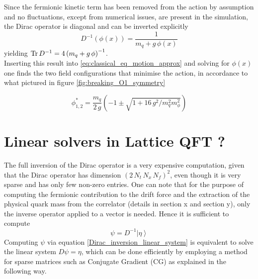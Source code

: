 Since the fermionic kinetic term has been removed from the action by assumption and no fluctuations, except from numerical issues, are present in the simulation, the Dirac operator is diagonal and can be inverted explicitly
\begin{equation}
    D^{-1}(\phi(x)) = \frac{1}{m_q + g \, \phi(x)}
    \label{eq:classical_eq_motion_approx}
\end{equation}
yielding $\operatorname{\text{Tr}} D^{-1} =  4 \left(m_q + g \, \phi\right)^{-1}$. \\
Inserting this result into \eqref{eq:classical_eq_motion_approx} and solving for $\phi(x)$ one finds the two field configurations that minimise the action, in accordance to what pictured in figure \ref{fig:breaking_O1_symmetry}

\begin{equation*}
    \phi^*_{1,2} = \frac{m_q}{2 \, g} \left(-1 \pm \sqrt{1 + 16 \, g^2 / m_q^2 m_\phi^2}\right)
\end{equation*}

\newpage 

\section{Linear solvers in Lattice QFT ?}
The full inversion of the Dirac operator is a very expensive computation, given that the Dirac operator has dimension $(2 \, N_t \, N_x \, N_f)^2$, even though it is very sparse and has only few non-zero entries. One can note that for the purpose of computing the fermionic contribution to the drift force and the extraction of the physical quark mass from the correlator (details in section x and section y), only the inverse operator applied to a vector is needed. Hence it is sufficient to compute 
\begin{equation}
    \psi = D^{-1} \left| \eta \right\rangle
    \label{Dirac_inversion_linear_system}
\end{equation}
Computing $\psi$ via equation \eqref{Dirac_inversion_linear_system} is equivalent to solve the linear system $D \psi = \eta$, which can be done efficiently by employing a method for sparse matrices such as Conjugate Gradient (CG) as explained in the following way.

